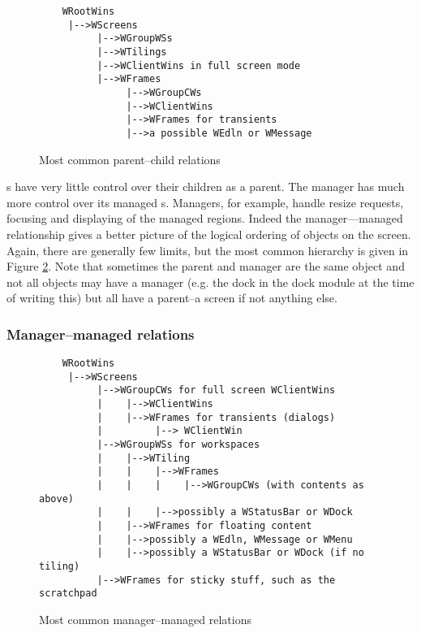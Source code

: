 \begin{figure}
\begin{htmlonly}
\docode %
\end{htmlonly}
\begin{verbatim}
    WRootWins
     |-->WScreens
          |-->WGroupWSs
          |-->WTilings
          |-->WClientWins in full screen mode
          |-->WFrames
               |-->WGroupCWs
               |-->WClientWins
               |-->WFrames for transients
               |-->a possible WEdln or WMessage
\end{verbatim}
\caption{Most common parent--child relations}
\label{fig:parentship}
\end{figure}

s have very little control over their children as a parent.
The manager  has much more control over its
managed s. Managers, for example, handle resize requests,
focusing and displaying of the managed regions. Indeed the manager---managed
relationship gives a better picture of the logical ordering of objects on
the screen. Again, there are generally few limits, but the most common
hierarchy is given in Figure \ref{fig:managership}. Note that sometimes
the parent and manager are the same object and not all objects may have
a manager (e.g. the dock in the dock module at the time of writing this)
but all have a parent--a screen if not anything else.

\subsubsection{Manager--managed relations}

\begin{figure}
\begin{htmlonly}
\docode %
\end{htmlonly}
\begin{verbatim}
    WRootWins
     |-->WScreens
          |-->WGroupCWs for full screen WClientWins
          |    |-->WClientWins
          |    |-->WFrames for transients (dialogs)
          |         |--> WClientWin
          |-->WGroupWSs for workspaces
          |    |-->WTiling
          |    |    |-->WFrames
          |    |    |    |-->WGroupCWs (with contents as above)
          |    |    |-->possibly a WStatusBar or WDock
          |    |-->WFrames for floating content
          |    |-->possibly a WEdln, WMessage or WMenu
          |    |-->possibly a WStatusBar or WDock (if no tiling)
          |-->WFrames for sticky stuff, such as the scratchpad
\end{verbatim}
\caption{Most common manager--managed relations}
\label{fig:managership}
\end{figure}

